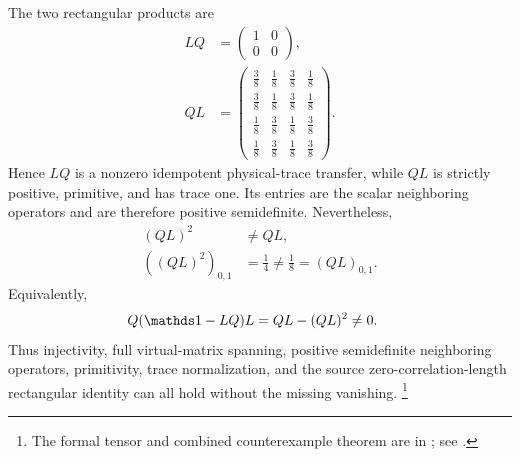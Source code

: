 \documentclass{article}
\begin{document}
The two rectangular products are
\begin{align}
    LQ
        &=
        \begin{pmatrix}
            1&0\\
            0&0
        \end{pmatrix},
    \label{eq:cpgsv17_psd_witness_physical_projection}\\
    QL
        &=
        \begin{pmatrix}
            \frac38&\frac18&\frac38&\frac18\\
            \frac38&\frac18&\frac38&\frac18\\
            \frac18&\frac38&\frac18&\frac38\\
            \frac18&\frac38&\frac18&\frac38
        \end{pmatrix}.
    \label{eq:cpgsv17_psd_witness_trace_matrix}
\end{align}
Hence $LQ$ is a nonzero idempotent physical-trace transfer, while $QL$ is
strictly positive, primitive, and has trace one. Its entries are the scalar
neighboring operators and are therefore positive semidefinite. Nevertheless,
\begin{align}
    (QL)^2
        &\neq QL,
    \label{eq:cpgsv17_psd_witness_nonidempotence}\\
    ((QL)^2)_{0,1}
        &= \frac14
         \neq \frac18
         = (QL)_{0,1}.
    \label{eq:cpgsv17_psd_witness_changed_entry}
\end{align}
Equivalently,
\begin{align}
    Q(\Id-LQ)L
        &= QL-(QL)^2
         \neq 0.
    \label{eq:cpgsv17_psd_witness_nonzero_remainder}
\end{align}
Thus injectivity, full virtual-matrix spanning, positive semidefinite
neighboring operators, primitivity, trace normalization, and the source
zero-correlation-length rectangular identity can all hold without the missing
vanishing.
\footnote{The formal tensor and combined counterexample theorem are in
; see
{\scriptsize{}}.}
\end{document}
